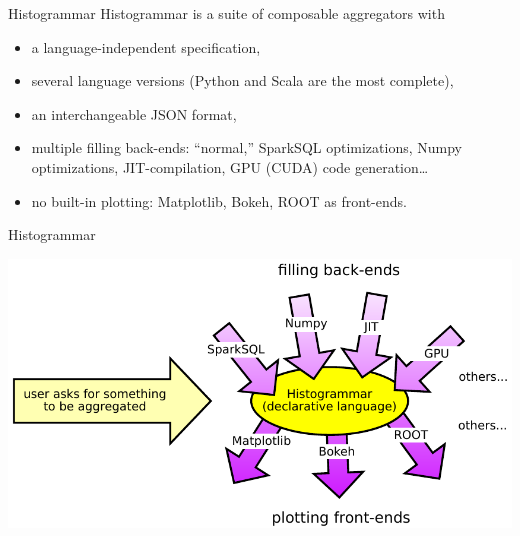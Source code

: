 \documentclass[aspectratio=169]{beamer}
\begin{document}
\begin{frame}{Histogrammar}
\large Histogrammar is a suite of composable aggregators with

\vspace{0.3 cm}
\begin{itemize}\setlength{\itemsep}{0.3 cm}
\item<2-> a language-independent specification,
\item<3-> several language versions (Python and Scala are the most complete),
\item<4-> an interchangeable JSON format,
\item<5-> multiple filling back-ends: ``normal,'' SparkSQL optimizations, Numpy optimizations, JIT-compilation, GPU (CUDA) code generation\ldots
\item<6-> no built-in plotting: Matplotlib, Bokeh, ROOT as front-ends.
\end{itemize}
\end{frame}

\begin{frame}{Histogrammar}
\vspace{0.5 cm}
\begin{center}
\includegraphics[width=0.9\linewidth]{front-back-ends.pdf}
\end{center}
\end{frame}
\end{document}
